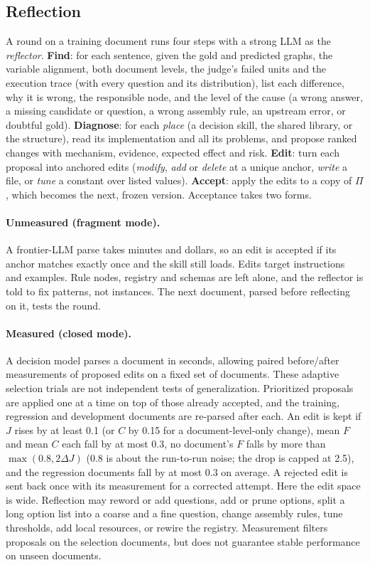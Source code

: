 \subsection{Reflection}
\label{sec:reflect}
A round on a training document runs four steps with a strong LLM as the \emph{reflector}. \textbf{Find}: for each sentence, given the gold and predicted graphs, the variable alignment, both document levels, the judge's failed units and the execution trace (with every question and its distribution), list each difference, why it is wrong, the responsible node, and the level of the cause (a wrong answer, a missing candidate or question, a wrong assembly rule, an upstream error, or doubtful gold). \textbf{Diagnose}: for each \emph{place} (a decision skill, the shared library, or the structure), read its implementation and all its problems, and propose ranked changes with mechanism, evidence, expected effect and risk. \textbf{Edit}: turn each proposal into anchored edits (\emph{modify}, \emph{add} or \emph{delete} at a unique anchor, \emph{write} a file, or \emph{tune} a constant over listed values). \textbf{Accept}: apply the edits to a copy of $\Pi$, which becomes the next, frozen version. Acceptance takes two forms.

\paragraph{Unmeasured (fragment mode).}
A frontier-LLM parse takes minutes and dollars, so an edit is accepted if its anchor matches exactly once and the skill still loads. Edits target instructions and examples. Rule nodes, registry and schemas are left alone, and the reflector is told to fix patterns, not instances. The next document, parsed before reflecting on it, tests the round.

\paragraph{Measured (closed mode).}
A decision model parses a document in seconds, allowing paired before/after measurements of proposed edits on a fixed set of documents. These adaptive selection trials are not independent tests of generalization. Prioritized proposals are applied one at a time on top of those already accepted, and the training, regression and development documents are re-parsed after each. An edit is kept if $J$ rises by at least 0.1 (or $C$ by 0.15 for a document-level-only change), mean $F$ and mean $C$ each fall by at most 0.3, no document's $F$ falls by more than $\max(0.8, 2\Delta J)$ (0.8 is about the run-to-run noise; the drop is capped at 2.5), and the regression documents fall by at most 0.3 on average. A rejected edit is sent back once with its measurement for a corrected attempt. Here the edit space is wide. Reflection may reword or add questions, add or prune options, split a long option list into a coarse and a fine question, change assembly rules, tune thresholds, add local resources, or rewire the registry. Measurement filters proposals on the selection documents, but does not guarantee stable performance on unseen documents.


